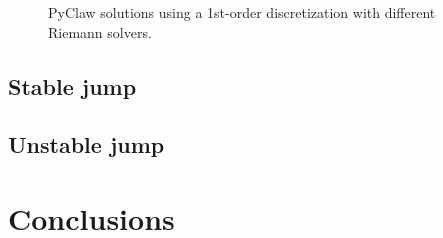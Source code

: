 \documentclass{article}
\begin{document}
\begin{figure}
  \begin{centering}
  \end{centering}
  \caption{
    PyClaw solutions using a 1st-order discretization
    with different Riemann solvers.\label{fig:hllemcc}}
\end{figure}



\subsection{Stable jump}

\subsection{Unstable jump}

\section{Conclusions}




\end{document}
